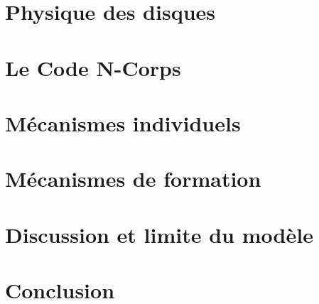\documentclass[logos,chaptertoc]{bordeaux-thesis}
\begin{document}






\chapter{Physique des disques}



\chapter{Le Code N-Corps}



\chapter{Mécanismes individuels}



\chapter{Mécanismes de formation}



\chapter{Discussion et limite du modèle}\label{sec:discussion}



\chapter*{Conclusion}






\end{document}
